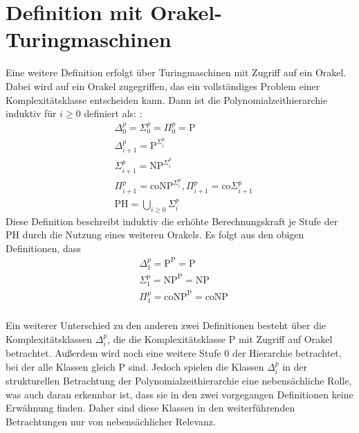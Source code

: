 \section{Definition mit Orakel-Turingmaschinen} \label{section: Definition PH mit Orakel-Turingmaschinen}
Eine weitere Definition erfolgt über Turingmaschinen mit Zugriff auf ein Orakel. Dabei wird auf ein Orakel zugegriffen, das ein vollständiges Problem einer Komplexitätsklasse entscheiden kann. 
Dann ist die Polynomialzeithierarchie induktiv für $i \geq 0$ definiert als: \cite{rothe_komplexitatstheorie_2008}:
\begin{align}
    & \Delta^p_0 = \Sigma^p_0 = \Pi^p_0 = \text{P} \\
    & \Delta^p_{i+1} = \text{P}^{\Sigma^p_i} \\
    &\Sigma^p_{i+1} = \text{NP}^{\Sigma^p_i} \\
    & \Pi^p_{i+1} = \text{coNP}^{\Sigma^p_i}, \Pi^p_{i+1} = \text{co}\Sigma^p_{i+1} \\
    & \text{PH} = \bigcup_{i \geq 0} \Sigma^p_i
\end{align}
Diese Definition beschreibt induktiv die erhöhte Berechnungskraft je Stufe der PH durch die Nutzung eines weiteren Orakels.
Es folgt aus den obigen Definitionen, dass 
\begin{align}
    & \Delta^p_1 = \text{P}^\text{P} = \text{P} \\
    & \Sigma^p_1 = \text{NP}^\text{P} = \text{NP} \\
    & \Pi^p_1 = \text{coNP}^\text{P} = \text{coNP} \\
\end{align}

Ein weiterer Unterschied zu den anderen zwei Definitionen besteht über die Komplexitätsklassen $\Delta^p_i$, die die Komplexitätsklasse P
mit Zugriff auf Orakel betrachtet. Außerdem wird noch eine weitere Stufe $0$ der Hierarchie betrachtet, bei der alle Klassen gleich P sind.
Jedoch spielen die Klassen $\Delta^p_i$ in der strukturellen Betrachtung der Polynomialzeithierarchie eine nebensächliche Rolle, was auch daran erkennbar ist, dass sie in den zwei vorgegangen Definitionen keine Erwähnung finden. Daher sind diese Klassen in den weiterführenden Betrachtungen 
nur von nebensächlicher Relevanz. \\

